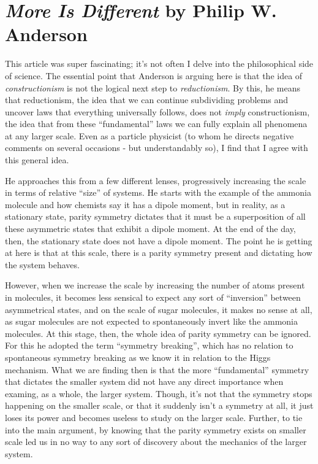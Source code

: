 \section{\textit{More Is Different} by Philip W. Anderson}

This article was super fascinating; it's not often I delve into the philosophical side of science. The essential point that Anderson is arguing here is that the idea of \textit{constructionism} is not the logical next step to \textit{reductionism}. By this, he means that reductionism, the idea that we can continue subdividing problems and uncover laws that everything universally follows, does not \textit{imply} constructionism, the idea that from these ``fundamental'' laws we can fully explain all phenomena at any larger scale. Even as a particle physicist (to whom he directs negative comments on several occasions - but understandably so), I find that I agree with this general idea.

He approaches this from a few different lenses, progressively increasing the scale in terms of relative ``size'' of systems. He starts with the example of the ammonia molecule and how chemists say it has a dipole moment, but in reality, as a stationary state, parity symmetry dictates that it must be a superposition of all these asymmetric states that exhibit a dipole moment. At the end of the day, then, the stationary state does not have a dipole moment. The point he is getting at here is that at this scale, there is a parity symmetry present and dictating how the system behaves.

However, when we increase the scale by increasing the number of atoms present in molecules, it becomes less sensical to expect any sort of ``inversion'' between asymmetrical states, and on the scale of sugar molecules, it makes no sense at all, as sugar molecules are not expected to spontaneously invert like the ammonia molecules. At this stage, then, the whole idea of parity symmetry can be ignored. For this he adopted the term ``symmetry breaking'', which has no relation to spontaneous symmetry breaking as we know it in relation to the Higgs mechanism. What we are finding then is that the more ``fundamental'' symmetry that dictates the smaller system did not have any direct importance when examing, as a whole, the larger system. Though, it's not that the symmetry stops happening on the smaller scale, or that it suddenly isn't a symmetry at all, it just loses its power and becomes useless to study on the larger scale. Further, to tie into the main argument, by knowing that the parity symmetry exists on smaller scale led us in no way to any sort of discovery about the mechanics of the larger system.


